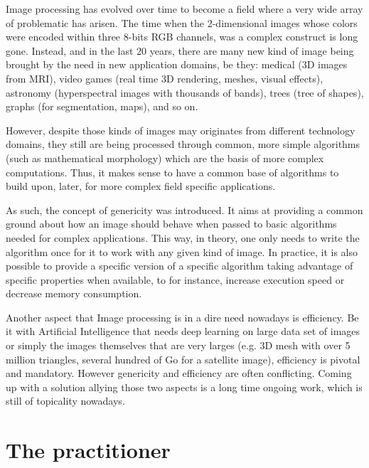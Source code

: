 Image processing has evolved over time to become a field where a very wide array of problematic has arisen. The time
when the 2-dimensional images whose colors were encoded within three 8-bits RGB channels, was a complex construct is
long gone. Instead, and in the last 20 years, there are many new kind of image being brought by the need in new
application domains, be they: medical (3D images from MRI), video games (real time 3D rendering, meshes, visual
effects), astronomy (hyperspectral images with thousands of bands), trees (tree of shapes), graphs (for segmentation,
maps), and so on.

However, despite those kinds of images may originates from different technology domains, they still are being processed
through common, more simple algorithms (such as mathematical morphology) which are the basis of more complex
computations. Thus, it makes sense to have a common base of algorithms to build upon, later, for more complex field
specific applications.

As such, the concept of genericity was introduced. It aims at providing a common ground about how an image should behave
when passed to basic algorithms needed for complex applications. This way, in theory, one only needs to write the
algorithm once for it to work with any given kind of image. In practice, it is also possible to provide a specific
version of a specific algorithm taking advantage of specific properties when available, to for instance, increase
execution speed or decrease memory consumption.

Another aspect that Image processing is in a dire need nowadays is efficiency. Be it with Artificial Intelligence that
needs deep learning on large data set of images or simply the images themselves that are very larges (e.g. 3D mesh with
over 5 million triangles, several hundred of Go for a satellite image), efficiency is pivotal and mandatory. However
genericity and efficiency are often conflicting. Coming up with a solution allying those two aspects is a long time
ongoing work, which is still of topicality nowadays.



\section{The practitioner}


